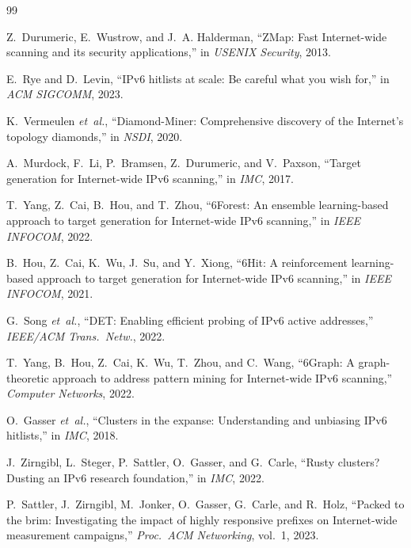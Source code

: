 \documentclass[conference]{IEEEtran}
\begin{document}

\begin{thebibliography}{99}

Z.~Durumeric, E.~Wustrow, and J.~A. Halderman, ``ZMap: Fast Internet-wide
scanning and its security applications,'' in \emph{USENIX Security}, 2013.

E.~Rye and D.~Levin, ``IPv6 hitlists at scale: Be careful what you wish
for,'' in \emph{ACM SIGCOMM}, 2023.

K.~Vermeulen \emph{et~al.}, ``Diamond-Miner: Comprehensive discovery of
the Internet's topology diamonds,'' in \emph{NSDI}, 2020.

A.~Murdock, F.~Li, P.~Bramsen, Z.~Durumeric, and V.~Paxson, ``Target
generation for Internet-wide IPv6 scanning,'' in \emph{IMC}, 2017.

T.~Yang, Z.~Cai, B.~Hou, and T.~Zhou, ``6Forest: An ensemble
learning-based approach to target generation for Internet-wide IPv6
scanning,'' in \emph{IEEE INFOCOM}, 2022.

B.~Hou, Z.~Cai, K.~Wu, J.~Su, and Y.~Xiong, ``6Hit: A reinforcement
learning-based approach to target generation for Internet-wide IPv6
scanning,'' in \emph{IEEE INFOCOM}, 2021.

G.~Song \emph{et~al.}, ``DET: Enabling efficient probing of IPv6 active
addresses,'' \emph{IEEE/ACM Trans.\ Netw.}, 2022.

T.~Yang, B.~Hou, Z.~Cai, K.~Wu, T.~Zhou, and C.~Wang, ``6Graph: A
graph-theoretic approach to address pattern mining for Internet-wide
IPv6 scanning,'' \emph{Computer Networks}, 2022.

O.~Gasser \emph{et~al.}, ``Clusters in the expanse: Understanding and
unbiasing IPv6 hitlists,'' in \emph{IMC}, 2018.

J.~Zirngibl, L.~Steger, P.~Sattler, O.~Gasser, and G.~Carle, ``Rusty
clusters? Dusting an IPv6 research foundation,'' in \emph{IMC}, 2022.

P.~Sattler, J.~Zirngibl, M.~Jonker, O.~Gasser, G.~Carle, and R.~Holz,
``Packed to the brim: Investigating the impact of highly responsive
prefixes on Internet-wide measurement campaigns,'' \emph{Proc.\ ACM
Networking}, vol.~1, 2023.


\end{thebibliography}
\end{document}
